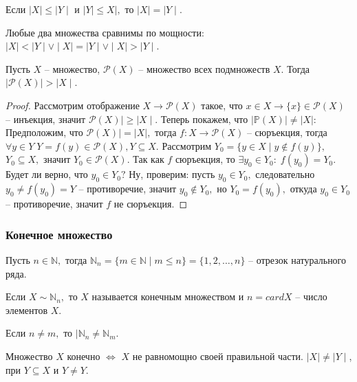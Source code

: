 \begin{Theorem}
Если $\mid X\mid\leq\mid Y\mid$ и $\mid Y\mid\leq X\mid,$ то $\mid X\mid = \mid Y\mid.$
\end{Theorem} 

Любые два множества сравнимы по мощности: $\mid X\mid<\mid Y\mid\vee \mid X\mid=\mid Y\mid\vee \mid X\mid>\mid Y\mid.$ 

\begin{Theorem}[Кантора]
Пусть $X$ -- множество, $\mathcal{P}(X)$ -- множество всех подмножеств $X.$ Тогда $\mid\mathcal{P}(X)\mid >\mid X\mid.$
\end{Theorem}
\begin{proof}
Рассмотрим отображение $X\rightarrow\mathcal{P}(X)$ такое, что $x\in X \rightarrow\{x\}\in\mathcal{P}(X)$ -- инъекция, значит $\mathcal{P}(X)\mid\geq\mid X\mid.$ Теперь покажем, что $\mid \mathbb{P}(X)\mid \neq\mid X\mid:$\\

Предположим, что $\mathcal{P}(X)\mid=\mid X\mid,$ тогда $f:X \rightarrow \mathcal{P}(X)$ -- сюръекция, тогда $\forall y \in Y \; Y=f(y)\in\mathcal{P}(X), Y\subseteq X.$ Рассмотрим $Y_0=\{y\in X\mid y\notin f(y)\},$  $Y_0\subseteq X,$ значит $Y_0\in\mathcal{P}(X).$ Так как $f$ сюръекция, то $\exists y_0 \in Y_0: \; f(y_0)=Y_0.$\\

Будет ли верно, что $y_0\in Y_0?$ Ну, проверим: пусть $y_0\in Y_0,$ следовательно $y_0 \neq f(y_0)=Y$ -- противоречие, значит $y_0 \notin Y_0,$ но $Y_0 = f(y_0),$ откуда $y_0\in Y_0$ -- противоречие, значит $f$ не сюръекция.
\end{proof}
\smallskip
\smallskip
\subsubsection{Конечное множество}
Пусть $n\in\mathbb{N},$ тогда $\mathbb{N}_n=\{m\in\mathbb{N}\mid m\leq n\}=\{1, 2,\ldots, n\}$ -- отрезок натурального ряда.
\begin{Definition}
Если $X\sim \mathbb{N}_n,$ то $X$ называется конечным множеством и $n=card X$ -- число элементов $X.$
\end{Definition}

Если $n\neq m,$ то $\mid\mathbb{N}_n\neq\mathbb{N}_m.$

\begin{Proposition}
Множество $X$ конечно $\Leftrightarrow$ $X$ не равномощно своей правильной части$.$ $\mid X\mid\neq\mid Y\mid$, при $Y\subseteq X$ и $Y\neq Y.$
\end{Proposition}

